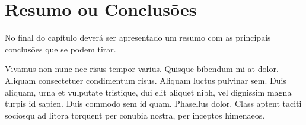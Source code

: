 \section{Resumo ou Conclusões}

No final do capítulo deverá ser apresentado um resumo com as 
principais conclusões que se podem tirar. 

Vivamus non nunc nec risus tempor varius. Quisque bibendum mi at
dolor. Aliquam consectetuer condimentum risus. Aliquam luctus pulvinar
sem. Duis aliquam, urna et vulputate tristique, dui elit aliquet nibh,
vel dignissim magna turpis id sapien. Duis commodo sem id
quam. Phasellus dolor. Class aptent taciti sociosqu ad litora torquent
per conubia nostra, per inceptos himenaeos. 
